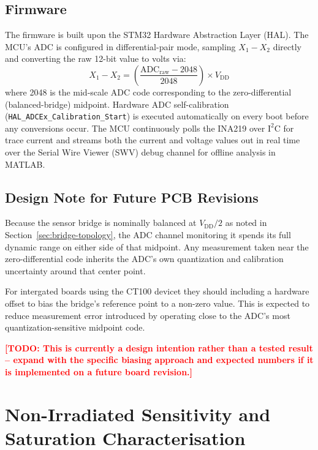 \documentclass[12pt,a4paper]{article}
\newcommand{\todo}[1]{\textcolor{red}{\textbf{[TODO: #1]}}}
\begin{document}
\subsection{Firmware}
\label{sec:firmware}

The firmware is built upon the STM32 Hardware Abstraction Layer (HAL). The MCU's ADC is configured in differential-pair mode, sampling \(X_1 - X_2\) directly and converting the raw 12-bit value to volts via:
\begin{equation}
X_1 - X_2 = \left( \frac{\text{ADC}_{\text{raw}} - 2048}{2048} \right) \times V_{\text{DD}}
\label{eq:adcconv}
\end{equation}
where 2048 is the mid-scale ADC code corresponding to the zero-differential (balanced-bridge) midpoint. Hardware ADC self-calibration (\texttt{HAL\_ADCEx\_Calibration\_Start}) is executed automatically on every boot before any conversions occur. The MCU continuously polls the INA219 over \(\text{I}^2\text{C}\) for trace current and streams both the current and voltage values out in real time over the Serial Wire Viewer (SWV) debug channel for offline analysis in MATLAB. 


\subsection{Design Note for Future PCB Revisions}
\label{sec:future-pcb-note}

Because the sensor bridge is nominally balanced at \(V_{\text{DD}}/2\) as noted in Section~\ref{sec:bridge-topology}, the ADC channel monitoring it spends its full dynamic range on either side of that midpoint. Any measurement taken near the zero-differential code inherits the ADC's own quantization and calibration uncertainty around that center point.

For intergated boards using the CT100 devicet they should including a hardware offset to bias the bridge's reference point to a non-zero value. This is expected to reduce measurement error introduced by operating close to the ADC's most quantization-sensitive midpoint code.

\todo{This is currently a design intention rather than a tested result -- expand with the specific biasing approach and expected numbers if it is implemented on a future board revision.}



\section{Non-Irradiated Sensitivity and Saturation Characterisation}
\label{sec:nonirr-characterisation}
\end{document}

